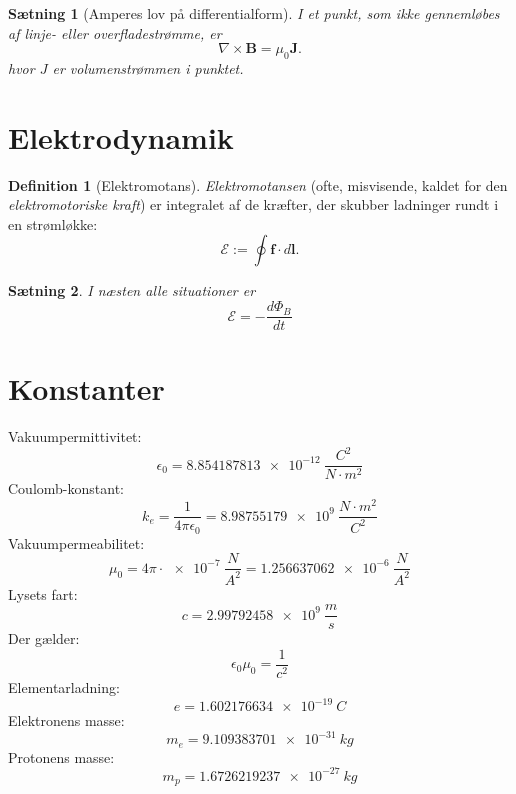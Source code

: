\documentclass[]{article}
\newtheorem{theorem}{Sætning}
\theoremstyle{definition}
\newtheorem{definition}{Definition}
\begin{document}
\begin{theorem}[Amperes lov på differentialform]
	I et punkt, som ikke gennemløbes af linje- eller overfladestrømme, er
	\begin{equation*}
		\nabla \times \mathbf{B} = \mu_0 \mathbf{J}.
	\end{equation*}
	hvor $J$ er volumenstrømmen i punktet.
\end{theorem}

\section{Elektrodynamik}
\begin{definition}[Elektromotans]
	\emph{Elektromotansen} (ofte, misvisende, kaldet for den \emph{elektromotoriske kraft}) er integralet af de kræfter, der skubber ladninger rundt i en strømløkke:
	\begin{equation*}
		\mathcal{E} := \oint \mathbf{f} \cdot d\mathbf{l}.
	\end{equation*}
\end{definition}
\begin{theorem}
	I næsten alle situationer er
\begin{equation*} 
	\mathcal{E} = -\dfrac{d \Phi_B}{dt}
\end{equation*}
\end{theorem}

\section{Konstanter}
Vakuumpermittivitet:
\begin{equation*}
	\epsilon_0 = \SI{8.854187813e-12}{\dfrac{C^2}{N \cdot m^2}}
\end{equation*}
Coulomb-konstant:
\begin{equation*}
	k_e = \frac{1}{4\pi \epsilon_0} = \SI{8.98755179e9}{\dfrac{N \cdot m^2}{C^2}}
\end{equation*}
Vakuumpermeabilitet:
\begin{equation*}
	\mu_0 = 4\pi \cdot \SI{e-7}{\frac{N}{A^2}} = \SI{1.256637062e-6}{\frac{N}{A^2}}
\end{equation*}
Lysets fart:
\begin{equation*}
	c = \SI{2.99 792 458e9}{\frac{m}{s}}
\end{equation*}
Der gælder:
\begin{equation*}
	\epsilon_0 \mu_0 = \dfrac{1}{c^2}
\end{equation*}
Elementarladning:
\begin{equation*}
	e = \SI{1.602176634e-19}{C}
\end{equation*}
Elektronens masse:
\begin{equation*}
	m_e = \SI{9.109383701e-31}{kg}
\end{equation*}
Protonens masse:
\begin{equation*}
	m_p = \SI{1.6726219237e-27}{kg}
\end{equation*}
\end{document}
